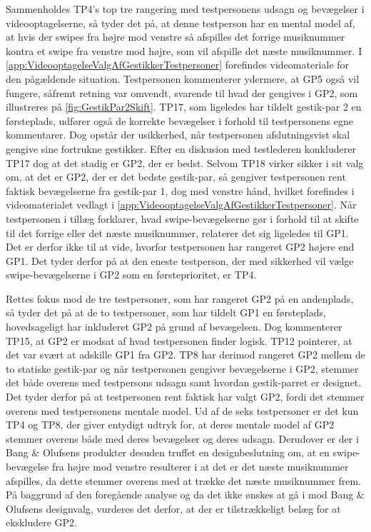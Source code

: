 Sammenholdes TP4's top tre rangering med testpersonens udsagn og bevægelser i videooptagelserne, så tyder det på, at denne testperson har en mental model af, at hvis der swipes fra højre mod venstre så afspilles det forrige musiknummer kontra et swipe fra venstre mod højre, som vil afspille det næste musiknummer. I \autoref{app:VideooptagelseValgAfGestikkerTestpersoner} forefindes videomateriale for den pågældende situation. Testpersonen kommenterer ydermere, at GP5 også vil fungere, såfremt retning var omvendt, svarende til hvad der gengives i GP2, som illustreres på \autoref{fig:GestikPar2Skift}. TP17, som ligeledes har tildelt gestik-par 2 en førsteplads, udfører også de korrekte bevægelser i forhold til testpersonens egne kommentarer. Dog opstår der usikkerhed, når testpersonen afslutningsvist skal gengive sine fortrukne gestikker. Efter en diskusion med testlederen konkluderer TP17 dog at det stadig er GP2, der er bedst. Selvom TP18 virker sikker i sit valg om, at det er GP2, der er det bedste gestik-par, så gengiver testpersonen rent faktisk bevægelserne fra gestik-par 1, dog med venstre hånd, hvilket forefindes i videomaterialet vedlagt i \autoref{app:VideooptagelseValgAfGestikkerTestpersoner}. Når testpersonen i tillæg forklarer, hvad swipe-bevægelserne gør i forhold til at skifte til det forrige eller det næste musiknummer, relaterer det sig ligeledes til GP1. Det er derfor ikke til at vide, hvorfor testpersonen har rangeret GP2 højere end GP1. Det tyder derfor på at den eneste testperson, der med sikkerhed vil vælge swipe-bevægelserne i GP2 som en førsteprioritet, er TP4. 

Rettes fokus mod de tre testpersoner, som har rangeret GP2 på en andenplads, så tyder det på at de to testpersoner, som har tildelt GP1 en førsteplads, hovedsageligt har inkluderet GP2 på grund af bevægelsen. Dog kommenterer TP15, at GP2 er modsat af hvad testpersonen finder logisk. TP12 pointerer, at det var svært at adskille GP1 fra GP2. TP8 har derimod rangeret GP2 mellem de to statiske gestik-par og når testpersonen gengiver bevægelserne i GP2, stemmer det både overens med testpersons udsagn samt hvordan gestik-parret er designet. Det tyder derfor på at testpersonen rent faktisk har valgt GP2, fordi det stemmer overens med testpersonens mentale model.\blankline 
%
Ud af de seks testpersoner er det kun TP4 og TP8, der giver entydigt udtryk for, at deres mentale model af GP2 stemmer overens både med deres bevægelser og deres udsagn. Derudover er der i Bang $\&$ Olufsens produkter desuden truffet en designbeslutning om, at en swipe-bevægelse fra højre mod venstre resulterer i at det er det næste musiknummer afspilles, da dette stemmer overens med at trække det næste musiknummer frem. På baggrund af den foregående analyse og da det ikke ønskes at gå i mod Bang $\&$ Olufsens designvalg, vurderes det derfor, at der er tilstrækkeligt belæg for at ekskludere GP2. 


